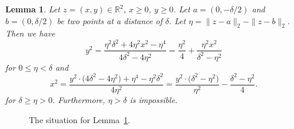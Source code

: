 \documentclass[11pt,DIV=12,a4paper]{scrartcl}
\newtheorem{lemma}[claim]{Lemma}
\newcommand{\real}{\ensuremath{\mathbb{R}}}
\begin{document}
\begin{lemma}
\label{lem:implicit}
Let $z = (x,y) \in \real^2$, $x\geq 0$, $y\geq 0$.
Let $a = (0, -\delta/2)$ and $b = (0, \delta/2)$ be two points at a distance of $\delta$.
Let $\eta = \|z-a\|_2 - \|z-b\|_2$. Then we have
\begin{equation}
  y^2 = \frac{\eta^2 \delta^2 + 4 \eta^2 x^2 - \eta^4}{4 \delta^2 - 4 \eta^2}
  = \frac{\eta^2}4 + \frac{\eta^2 x^2}{\delta^2 - \eta^2}
\label{expr:y}
\end{equation}
for $0 \leq \eta < \delta$
and
\begin{equation}
x^2 = \frac{y^2 \cdot \bigl(4 \delta^2 - 4 \eta^2) + \eta^4 - \eta^2 \delta^2}{4\eta^2}
=\frac{y^2 \cdot \bigl(\delta^2 - \eta^2)}{\eta^2} - \frac{\delta^2 - \eta^2}{4}.
\label{expr:x}
\end{equation}
for $\delta \geq \eta > 0$.
Furthermore, $\eta > \delta$ is impossible.
\end{lemma}


\begin{figure}[t]
\centering
{}
\caption{The situation for Lemma~\ref{lem:implicit}.}
\label{fig:implicit}
\end{figure}
\end{document}
